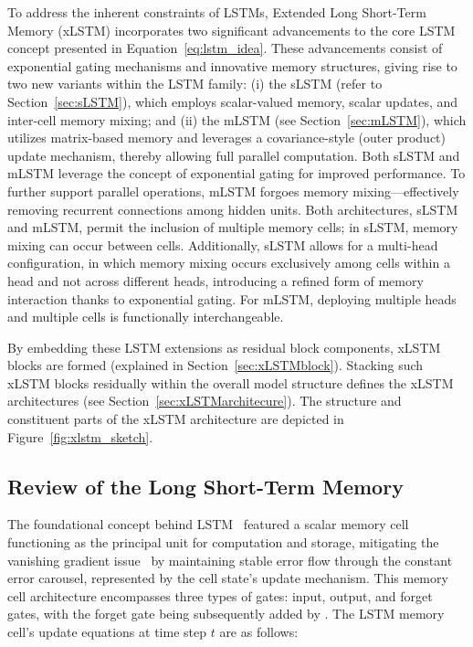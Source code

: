 To address the inherent constraints of LSTMs, Extended Long Short-Term Memory (xLSTM) incorporates two significant advancements to the core LSTM concept presented in Equation~\eqref{eq:lstm_idea}. These advancements consist of exponential gating mechanisms and innovative memory structures, giving rise to two new variants within the LSTM family: (i) the sLSTM (refer to Section~\ref{sec:sLSTM}), which employs scalar-valued memory, scalar updates, and inter-cell memory mixing; and (ii) the mLSTM (see Section~\ref{sec:mLSTM}), which utilizes matrix-based memory and leverages a covariance-style (outer product) update mechanism, thereby allowing full parallel computation. Both sLSTM and mLSTM leverage the concept of exponential gating for improved performance. To further support parallel operations, mLSTM forgoes memory mixing—effectively removing recurrent connections among hidden units. Both architectures, sLSTM and mLSTM, permit the inclusion of multiple memory cells; in sLSTM, memory mixing can occur between cells. Additionally, sLSTM allows for a multi-head configuration, in which memory mixing occurs exclusively among cells within a head and not across different heads, introducing a refined form of memory interaction thanks to exponential gating. For mLSTM, deploying multiple heads and multiple cells is functionally interchangeable.

By embedding these LSTM extensions as residual block components, xLSTM blocks are formed (explained in Section~\ref{sec:xLSTMblock}). Stacking such xLSTM blocks residually within the overall model structure defines the xLSTM architectures (see Section~\ref{sec:xLSTMarchitecure}). The structure and constituent parts of the xLSTM architecture are depicted in Figure~\ref{fig:xlstm_sketch}.

\subsection{Review of the Long Short-Term Memory}
\label{sec:orgLSTM}

The foundational concept behind LSTM~\citep{Hochreiter:91,Hochreiter:97nips,Hochreiter:97} featured a scalar memory cell functioning as the principal unit for computation and storage, mitigating the vanishing gradient issue~\citep{Hochreiter:91,Hochreiter:00book} by maintaining stable error flow through the constant error carousel, represented by the cell state's update mechanism. This memory cell architecture encompasses three types of gates: input, output, and forget gates, with the forget gate being subsequently added by \citet{Gers:00}. The LSTM memory cell's update equations at time step $t$ are as follows:

